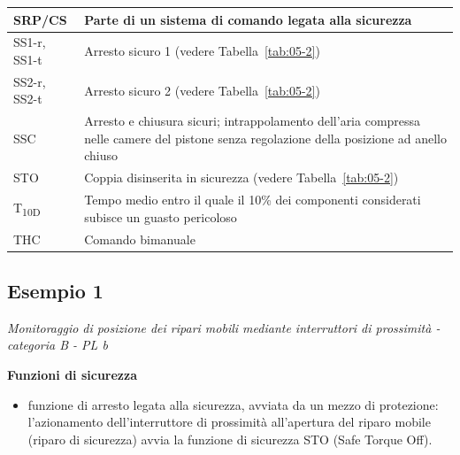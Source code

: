 \begin{longtable}{|p{2.4cm}|p{\dimexpr\textwidth-2.4cm-4\tabcolsep-3\arrayrulewidth\relax}|}
    \hline
    SRP/CS & Parte di un sistema di comando legata alla sicurezza \\
    \hline
    \rowcolor{black!8}
    SS1-r, SS1-t & Arresto sicuro 1 (vedere Tabella~\ref{tab:05-2}) \\
    \hline
    SS2-r, SS2-t & Arresto sicuro 2 (vedere Tabella~\ref{tab:05-2}) \\
    \hline
    \rowcolor{black!8}
    SSC & Arresto e chiusura sicuri; intrappolamento dell'aria compressa nelle camere del pistone senza regolazione della posizione ad anello chiuso \\
    \hline
    STO & Coppia disinserita in sicurezza (vedere Tabella~\ref{tab:05-2}) \\
    \hline
    \rowcolor{black!8}
    T\textsubscript{10D} & Tempo medio entro il quale il 10\% dei componenti considerati subisce un guasto pericoloso \\
    \hline
    THC & Comando bimanuale \\
\end{longtable}
\endgroup
\clearpage
\subsection{Esempio 1}
\label{sec:08-2-1}
\textit{Monitoraggio di posizione dei ripari mobili mediante interruttori di prossimità - categoria B - PL b}

\begin{center}
    \begin{minipage}{\textwidth}
        \centering
        \captionsetup{hypcap=false}
        \resizebox{0.6\textwidth}{!}{}
        \label{fig:08-03}
    \end{minipage}
\end{center}

\textbf{Funzioni di sicurezza}
\begin{itemize}
    \item funzione di arresto legata alla sicurezza, avviata da un mezzo di protezione: l'azionamento dell'interruttore di prossimità all'apertura del riparo mobile (riparo di sicurezza) avvia la funzione di sicurezza STO (Safe Torque Off).
\end{itemize}

